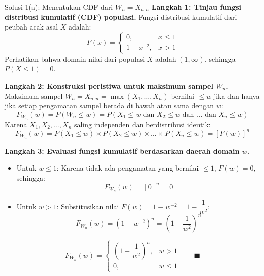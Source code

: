 \documentclass[10pt,twoside]{article}
\begin{document}
\begin{solbox}{Solusi 1(a): Menentukan CDF dari $W_n = X_{n:n}$}
\textbf{Langkah 1: Tinjau fungsi distribusi kumulatif (CDF) populasi.}
Fungsi distribusi kumulatif dari peubah acak asal $X$ adalah:
\[
F(x) = \begin{cases} 0, & x \le 1 \\ 1 - x^{-2}, & x > 1 \end{cases}
\]
Perhatikan bahwa domain nilai dari populasi $X$ adalah $(1, \infty)$, sehingga $P(X \le 1) = 0$.

\textbf{Langkah 2: Konstruksi peristiwa untuk maksimum sampel $W_n$.}
Maksimum sampel $W_n = X_{n:n} = \max(X_1, \dots, X_n)$ bernilai $\le w$ jika dan hanya jika setiap pengamatan sampel berada di bawah atau sama dengan $w$:
\[
F_{W_n}(w) = P(W_n \le w) = P(X_1 \le w \text{ dan } X_2 \le w \text{ dan } \dots \text{ dan } X_n \le w)
\]
Karena $X_1, X_2, \dots, X_n$ saling independen dan berdistribusi identik:
\[
F_{W_n}(w) = P(X_1 \le w) \times P(X_2 \le w) \times \dots \times P(X_n \le w) = [F(w)]^n
\]

\textbf{Langkah 3: Evaluasi fungsi kumulatif berdasarkan daerah domain $w$.}
\begin{itemize}
  \item Untuk $w \le 1$: Karena tidak ada pengamatan yang bernilai $\le 1$, $F(w) = 0$, sehingga:
  \[
  F_{W_n}(w) = [0]^n = 0
  \]
  \item Untuk $w > 1$: Substitusikan nilai $F(w) = 1 - w^{-2} = 1 - \dfrac{1}{w^2}$:
  \[
  F_{W_n}(w) = \left(1 - w^{-2}\right)^n = \left(1 - \frac{1}{w^2}\right)^n
  \]
\end{itemize}

\[
\boxed{F_{W_n}(w) = \begin{cases} \left(1 - \dfrac{1}{w^2}\right)^n, & w > 1 \\ 0, & w \le 1 \end{cases}} \qquad \blacksquare
\]
\end{solbox}
\end{document}
